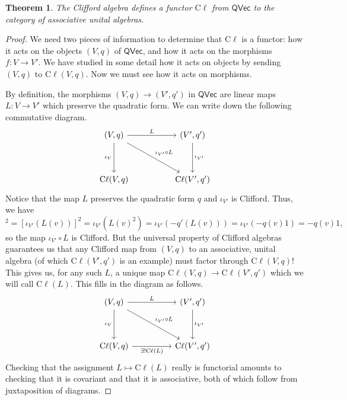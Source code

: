 \documentclass[a4paper]{report}
\newcommand{\cliff}{\mathrm{C}\ell}
\theoremstyle{definition}
\theoremstyle{plain}
\newtheorem{theorem}{Theorem}[section]
\theoremstyle{remark}
\begin{document}
\begin{theorem}
  \label{thm:cliffordmapisafunctor}
  The Clifford algebra defines a functor $\cliff$ from $\mathsf{QVec}$ to the category of associative unital algebras.
\end{theorem}
\begin{proof}
  We need two pieces of information to determine that $\cliff$ is a functor: how it acts on the objects $(V,q)$ of $\mathsf{QVec}$, and how it acts on the morphisms $f\colon V \to V'$. We have studied in some detail how it acts on objects by sending $(V,q)$ to $\cliff(V,q)$. Now we must see how it acts on morphisms.

  By definition, the morphisms $(V,q) \to (V', q')$ in $\mathsf{QVec}$ are linear maps $L\colon V \to V'$ which preserve the quadratic form. We can write down the following commutative diagram.
  \begin{equation*}
    \begin{tikzcd}[row sep=huge, column sep=huge]
      {(V,q)} \arrow[dr, "\iota_{V'} \circ L"] \arrow[d, swap, "\iota_{V}"] \arrow[r, "L"] & {(V', q')} \arrow[d, "\iota_{V'}"] \\
      {\cliff(V,q)} & {\cliff(V', q')}
    \end{tikzcd}
  \end{equation*}
  Notice that the map $L$ preserves the quadratic form $q$ and $\iota_{V'}$ is Clifford. Thus, we have 
  \begin{equation*}
    [(\iota_{V'} \circ L)(v)]^{2} = [\iota_{V'}(L(v))]^2 = \iota_{V'}(L(v)^2) = \iota_{V'}(-q'(L(v))) = \iota_{V'}(-q(v)1) = -q(v) 1,
  \end{equation*}
  so the map $\iota_{V'} \circ L$ is Clifford. But the universal property of Clifford algebras guarantees us that any Clifford map from $(V,q)$ to an associative, unital algebra (of which $\cliff(V', q')$ is an example) must factor through $\cliff(V,q)$! This gives us, for any such $L$, a unique map $\cliff(V,q) \to \cliff(V', q')$ which we will call $\cliff(L)$. This fills in the diagram as follows.
  \begin{equation*}
    \begin{tikzcd}[row sep=huge, column sep=huge]
      {(V,q)} \arrow[dr, "\iota_{V'} \circ L"] \arrow[d, swap, "\iota_{V}"] \arrow[r, "L"] & {(V', q')} \arrow[d, "\iota_{V'}"] \\
      {\cliff(V,q)} \arrow[r, swap, "\exists!\cliff(L)"] & {\cliff(V', q')}
    \end{tikzcd}
  \end{equation*}
  Checking that the assignment $L \mapsto \cliff(L)$ really is functorial amounts to checking that it is covariant and that it is associative, both of which follow from juxtaposition of diagrams.
\end{proof}
\end{document}
